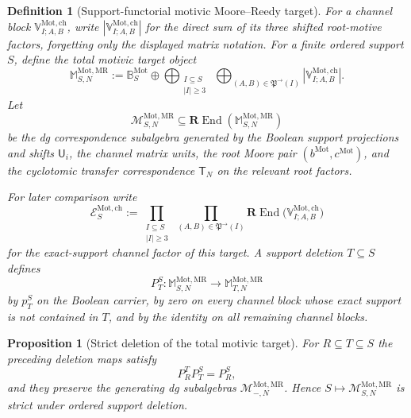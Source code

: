\documentclass[11pt]{article}
\newtheorem{proposition}[theorem]{Proposition}
\newtheorem{definition}[theorem]{Definition}
\theoremstyle{remark}
\newcommand{\REnd}{\mathbf R\!\operatorname{End}}
\newcommand{\Mot}{\mathrm{Mot}}
\newcommand{\MR}{\mathrm{MR}}
\begin{document}
\begin{definition}[Support-functorial motivic Moore--Reedy target]
\label{P2M-def:genuine-motivic-rees-cartan}
For a channel block $\mathbb V_{I;A,B}^{\Mot,\mathrm{ch}}$, write
$|\mathbb V_{I;A,B}^{\Mot,\mathrm{ch}}|$ for the direct sum of its three
shifted root-motive factors, forgetting only the displayed matrix notation.
For a finite ordered support $S$, define the total motivic target object
\begin{equation}
 \boxed{
 \mathbb M_{S,N}^{\Mot,\MR}
 :=\mathbb B_S^{\Mot}
 \oplus
 \bigoplus_{\substack{I\subseteq S\\|I|\ge3}}
 \ \bigoplus_{(A,B)\in\mathfrak P^{\to}(I)}
 |\mathbb V_{I;A,B}^{\Mot,\mathrm{ch}}|.}
\end{equation}
Let
\begin{equation}
 \boxed{
 \mathscr M_{S,N}^{\Mot,\MR}
 \subseteq
 \REnd(\mathbb M_{S,N}^{\Mot,\MR})}
\end{equation}
be the dg correspondence subalgebra generated by the Boolean support
projections and shifts $\mathsf U_i$, the channel matrix units, the root Moore
pair $(b^{\Mot},c^{\Mot})$, and the cyclotomic transfer correspondence
$\mathsf T_N$ on the relevant root factors.

For later comparison write
\[
 \mathscr E_S^{\Mot,\mathrm{ch}}
 :=\prod_{\substack{I\subseteq S\\|I|\ge3}}
   \ \prod_{(A,B)\in\mathfrak P^{\to}(I)}
   \REnd\bigl(\mathbb V_{I;A,B}^{\Mot,\mathrm{ch}}\bigr)
\]
for the exact-support channel factor of this target.
A support deletion $T\subseteq S$ defines
\begin{equation}\label{P2M-eq:v19-total-target-deletion-map}
 P_T^S:\mathbb M_{S,N}^{\Mot,\MR}\longrightarrow
 \mathbb M_{T,N}^{\Mot,\MR}
\end{equation}
by $p_T^S$ on the Boolean carrier, by zero on every channel block whose exact
support is not contained in $T$, and by the identity on all remaining channel
blocks.
\end{definition}

\begin{proposition}[Strict deletion of the total motivic target]
\label{P2M-prop:v19-total-target-deletion}
For $R\subseteq T\subseteq S$ the preceding deletion maps satisfy
\begin{equation}
 \boxed{P_R^T P_T^S=P_R^S,}
\end{equation}
and they preserve the generating dg subalgebras
$\mathscr M_{-,N}^{\Mot,\MR}$.  Hence
$S\mapsto\mathscr M_{S,N}^{\Mot,\MR}$ is strict under ordered support
deletion.
\end{proposition}
\end{document}
